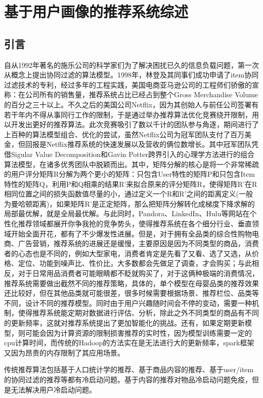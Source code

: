 \chapter{基于用户画像的推荐系统综述}
	\section{引言}
	自从1992年著名的施乐公司的科学家们为了解决困扰已久的信息负载问题，第一次从概念上提出协同过滤的算法模型。1998年，林登及其同事们成功申请了item协同过滤技术的专利，经过多年的工程实践，美国电商亚马逊公司的工程师们骄傲的宣称：在公司所有的销售量，推荐系统占比已经占到整个Gross Merchandise Volume的百分之三十以上。不久之后的美国公司Netflix，因为其创始人与前任公司签署有若干年内不得从事同行工作的限制，于是通过举办推荐算法优化竞赛绕开限制，用以开发出更好的推荐算法。此次竞赛吸引了数以千计的团队参与角逐，期间进行了上百种的算法模型组合、优化的尝试，虽然Netflix公司为冠军团队支付了百万美金，但回报是Netflix推荐系统的快速发展以及营收的俩位数增长。其中冠军团队凭借Sigular Value Decomposition和Gavin Potter跨界引入的心理学方法进行的组合算法模型，在诸多优秀团队中脱颖而出。其中，矩阵分解的核心是将一个非常稀疏的用户评分矩阵R分解为两个更小的矩阵：只包含User特性的矩阵P和只包含Item特性的矩阵Q，利用P和Q相乘的结果R'来拟合原来的评分矩阵R，使得矩阵R'在R相同位置之间的损失函数值尽量的小，通过定义一个R和R'之间的距离定义(一般为曼哈顿距离)，如果矩阵R'是正定矩阵，那么把矩阵分解转化成梯度下降求解的局部最优解，就是全局最优解。与此同时，Pandora、LinkedIn、Hulu等网站在个性化推荐领域都展开你争我抢的竞争势头，使得推荐系统在各个细分行业、垂直领域开始全面开花，都有了不少爆发性进展。但是，对于拥有全品类的综合性购物电商、广告营销，推荐系统的进展还是缓慢，主要原因是因为不同类型的商品，消费者的心态也是不同的，例如大型家电，消费者肯定是先看了又看、选了又选，从价格、定位、功能到噪声比、性价比，大多数都会先做足了调查，才会购买；与此相反，对于日常用品消费者可能眼睛都不眨就购买了，对于这俩种极端的消费情况，推荐系统需要做出截然不同的推荐策略，具体的，单个模型在母婴品类的推荐效果还比较好，但在其他品类就可能很差，很多时候需要根据场景、推荐栏位、品类等不同，设计不同的推荐模型。同时由于用户兴趣随时间会不停的变动，需要一种机制，使得推荐系统能定期对数据进行评估、分析，除此之外不同类型的商品有不同的更新频率，这就对推荐系统提出了更加智能化的挑战。还有，如果定期更新模型，则可能会因为计算资源的限制损害推荐的实时性\citep{temporal-cf}，因为模型训练需要一定的cpu计算时间，而传统的Hadoop的方法实在是无法进行大的更新频率，spark框架又因为昂贵的内存限制了其应用场景。

	传统推荐算法包括基于人口统计学的推荐\citep{social-filter}、基于商品内容的推荐\citep{content-based}、基于user/item的协同过滤\citep{collab-filter}的推荐等都有冷启动问题。基于内容的推荐对物品冷启动问题免疫，但是无法解决用户冷启动问题\citep{cold-start}。

